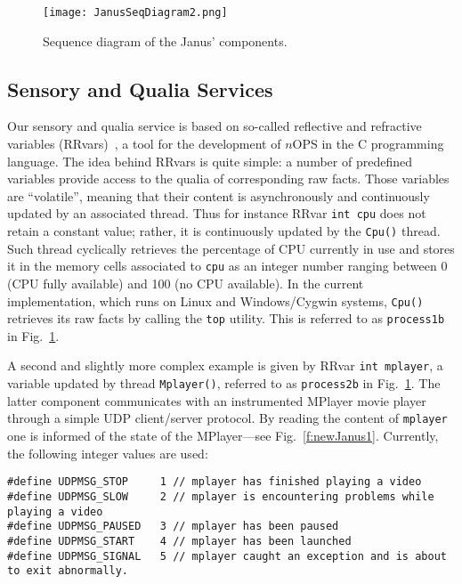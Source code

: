 \documentclass{article}
\begin{document}
\begin{figure}
\texttt{[image: JanusSeqDiagram2.png]}
\caption{Sequence diagram of the Janus' components.}
\label{f:Janus}
\end{figure}


\subsection{Sensory and Qualia Services}\label{s:janus:rrvars}
Our sensory and qualia service is based on so-called reflective and refractive
variables (RRvars)~\cite{DeBl08a,DB07d}, a tool for the development of $n$OPS in the C
programming language. The idea behind RRvars is quite simple: a number of
predefined variables provide access to the qualia of corresponding raw facts.
Those variables are ``volatile'', meaning that their content is asynchronously
and continuously updated by an associated thread. Thus for instance RRvar \verb"int cpu" does not
retain a constant value; rather, it is continuously updated by the \verb"Cpu()" thread.
Such thread cyclically
retrieves the percentage of CPU currently in use and stores it in the
memory cells associated to \verb"cpu" as an integer number ranging between 0 (CPU fully available)
and 100 (no CPU available). In the current implementation, which runs on 
Linux and Windows/Cygwin systems, \verb"Cpu()" retrieves its raw facts by calling
the \verb"top" utility.
This is referred to as \texttt{process1b} in Fig.~\ref{f:Janus}.

A second and slightly more complex example is given by RRvar \verb"int mplayer", a variable updated
by thread \verb"Mplayer()", referred to as \texttt{process2b} in Fig.~\ref{f:Janus}. The latter component communicates with an instrumented MPlayer movie player~\cite{Mplayer} through
a simple UDP client/server protocol. By reading the content of \verb"mplayer" one is informed of the state of the MPlayer---see Fig.~\ref{f:newJanus1}.
Currently, the following integer values are used:
\begin{verbatim}
#define UDPMSG_STOP     1 // mplayer has finished playing a video
#define UDPMSG_SLOW     2 // mplayer is encountering problems while playing a video
#define UDPMSG_PAUSED   3 // mplayer has been paused
#define UDPMSG_START    4 // mplayer has been launched
#define UDPMSG_SIGNAL   5 // mplayer caught an exception and is about to exit abnormally.
\end{verbatim}
\end{document}
